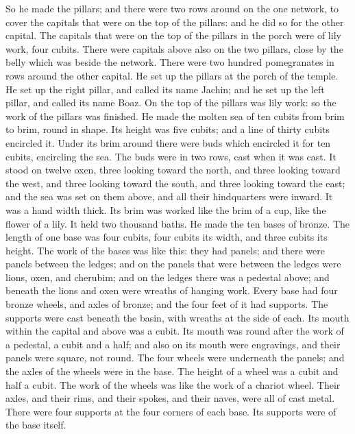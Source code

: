 {So he made the pillars; and there were two rows around on the one network, to cover the capitals that were on the top of the pillars: and he did so for the other capital.
The capitals that were on the top of the pillars in the porch were of lily work, four cubits.
There were capitals above also on the two pillars, close by the belly which was beside the network. There were two hundred pomegranates in rows around the other capital.
He set up the pillars at the porch of the temple. He set up the right pillar, and called its name Jachin; and he set up the left pillar, and called its name Boaz.
On the top of the pillars was lily work: so the work of the pillars was finished.
He made the molten sea of ten cubits from brim to brim, round in shape. Its height was five cubits; and a line of thirty cubits encircled it.
Under its brim around there were buds which encircled it for ten cubits, encircling the sea. The buds were in two rows, cast when it was cast.
It stood on twelve oxen, three looking toward the north, and three looking toward the west, and three looking toward the south, and three looking toward the east; and the sea was set on them above, and all their hindquarters were inward.
It was a hand width thick. Its brim was worked like the brim of a cup, like the flower of a lily. It held two thousand baths.
He made the ten bases of bronze. The length of one base was four cubits, four cubits its width, and three cubits its height.
The work of the bases was like this: they had panels; and there were panels between the ledges;
and on the panels that were between the ledges were lions, oxen, and cherubim; and on the ledges there was a pedestal above; and beneath the lions and oxen were wreaths of hanging work.
Every base had four bronze wheels, and axles of bronze; and the four feet of it had supports. The supports were cast beneath the basin, with wreaths at the side of each.
Its mouth within the capital and above was a cubit. Its mouth was round after the work of a pedestal, a cubit and a half; and also on its mouth were engravings, and their panels were square, not round.
The four wheels were underneath the panels; and the axles of the wheels were in the base. The height of a wheel was a cubit and half a cubit.
The work of the wheels was like the work of a chariot wheel. Their axles, and their rims, and their spokes, and their naves, were all of cast metal.
There were four supports at the four corners of each base. Its supports were of the base itself.
}
